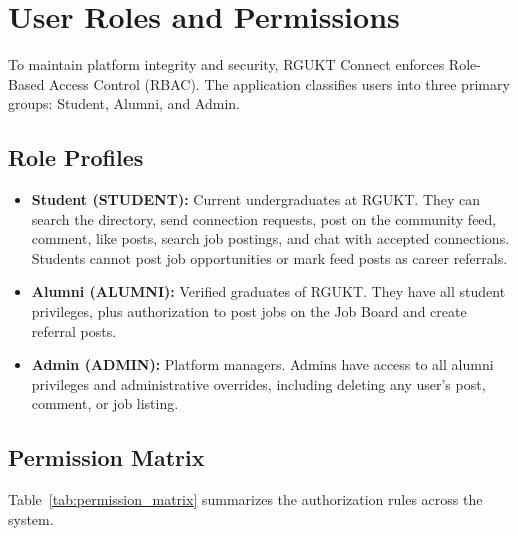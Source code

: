 \chapter{User Roles and Permissions}
\label{ch:user_roles}

To maintain platform integrity and security, RGUKT Connect enforces Role-Based Access Control (RBAC). The application classifies users into three primary groups: Student, Alumni, and Admin.

\section{Role Profiles}
\begin{itemize}
    \item \textbf{Student (STUDENT):} Current undergraduates at RGUKT. They can search the directory, send connection requests, post on the community feed, comment, like posts, search job postings, and chat with accepted connections. Students cannot post job opportunities or mark feed posts as career referrals.
    \item \textbf{Alumni (ALUMNI):} Verified graduates of RGUKT. They have all student privileges, plus authorization to post jobs on the Job Board and create referral posts.
    \item \textbf{Admin (ADMIN):} Platform managers. Admins have access to all alumni privileges and administrative overrides, including deleting any user's post, comment, or job listing.
\end{itemize}

\section{Permission Matrix}
Table~\ref{tab:permission_matrix} summarizes the authorization rules across the system.

